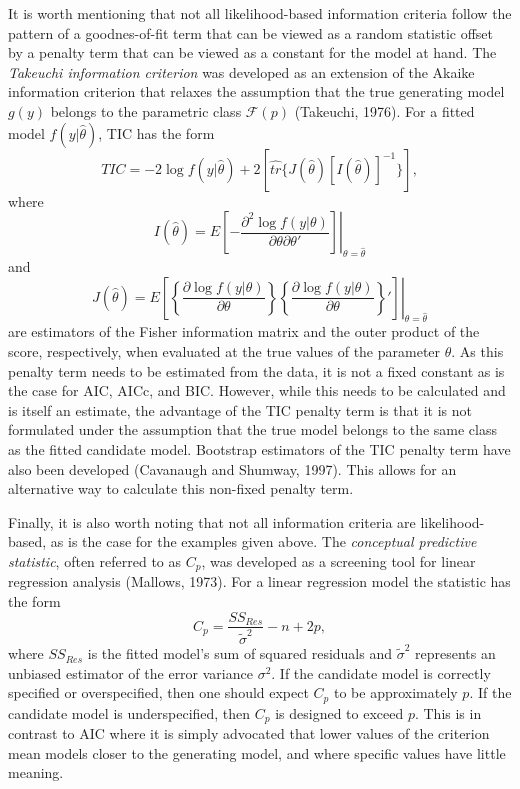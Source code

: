 		It is worth mentioning that not all likelihood-based information criteria follow the pattern of a goodnes-of-fit term that can be viewed as a random statistic offset by a penalty term that
		can be viewed as a constant for the model at hand. The \textit{Takeuchi information criterion} was developed as an extension of the Akaike information criterion that relaxes the
		assumption that the true generating model $g(y)$ belongs to the parametric class $\mathcal{F}(p)$ (Takeuchi, 1976). For a fitted model $f(y|\hat{\theta})$, TIC has the form
		\begin{equation}
			TIC = -2 \log f(y|\hat{\theta}) + 2 \left[ \hat{tr} \{ J(\hat{\theta}) [I(\hat{\theta})]^{-1} \} \right] ,
		\end{equation}
		where
		\begin{equation}
			I(\hat{\theta}) = E \left. \left[ -\frac{\partial^2 \log f(y|\theta)}{\partial \theta \partial \theta '} \right] \right|_{\theta = \hat{\theta}}
		\end{equation}
		and
		\begin{equation}
			J(\hat{\theta}) = E \left. \left[ \left\{ \frac{\partial \log f(y|\theta)}{\partial \theta} \right\} \left\{ \frac{\partial \log f(y|\theta)}{\partial \theta} \right\}'  \right] \right|_{\theta = \hat{\theta}}
		\end{equation}
		are estimators of the Fisher information matrix and the outer product of the score, respectively, when evaluated at the true values of the parameter $\theta$. As this penalty term needs
		to be estimated from the data, it is not a fixed constant as is the case for AIC, AICc, and BIC. However, while this needs to be calculated and is itself an estimate, the advantage of
		the TIC penalty term is that it is not formulated under the assumption that the true model belongs to the same class as the fitted candidate model. Bootstrap estimators of the TIC
		penalty term have also been developed (Cavanaugh and Shumway, 1997). This allows for an alternative way to calculate this non-fixed penalty term.

		Finally, it is also worth noting that not all information criteria are likelihood-based, as is the case for the examples given above. The \textit{conceptual predictive statistic}, often
		referred to as $C_p$, was developed as a screening tool for linear regression analysis (Mallows, 1973). For a linear regression model the statistic has the form
		\begin{equation}
			C_p = \frac{SS_{Res}}{\tilde{\sigma}^2} - n + 2p ,
		\end{equation}
		where $SS_{Res}$ is the fitted model's sum of squared residuals and $\tilde{\sigma}^2$ represents an unbiased estimator of the error variance $\sigma^2$. If the candidate model is correctly
		specified or overspecified, then one should expect $C_p$ to be approximately $p$. If the candidate model is underspecified, then $C_p$ is designed to exceed $p$. This is in contrast to AIC
		where it is simply advocated that lower values of the criterion mean models closer to the generating model, and where specific values have little meaning.
		
